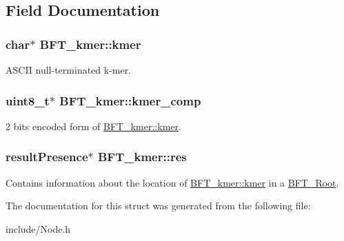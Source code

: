 \subsection{Field Documentation}
\subsubsection[{\texorpdfstring{kmer}{kmer}}]{\setlength{\rightskip}{0pt plus 5cm}char$\ast$ B\+F\+T\+\_\+kmer\+::kmer}\hypertarget{structBFT__kmer_ae4cf6766f01ebfa54fe51d0e60bec942}{}\label{structBFT__kmer_ae4cf6766f01ebfa54fe51d0e60bec942}


A\+S\+C\+II null-\/terminated k-\/mer. 

\subsubsection[{\texorpdfstring{kmer\+\_\+comp}{kmer_comp}}]{\setlength{\rightskip}{0pt plus 5cm}uint8\+\_\+t$\ast$ B\+F\+T\+\_\+kmer\+::kmer\+\_\+comp}\hypertarget{structBFT__kmer_a9935a78617deffcf7a24fcca0143962c}{}\label{structBFT__kmer_a9935a78617deffcf7a24fcca0143962c}


2 bits encoded form of \hyperlink{structBFT__kmer_ae4cf6766f01ebfa54fe51d0e60bec942}{B\+F\+T\+\_\+kmer\+::kmer}. 

\subsubsection[{\texorpdfstring{res}{res}}]{\setlength{\rightskip}{0pt plus 5cm}result\+Presence$\ast$ B\+F\+T\+\_\+kmer\+::res}\hypertarget{structBFT__kmer_aab6ab4e17d069ebb9e5c467d8fee5002}{}\label{structBFT__kmer_aab6ab4e17d069ebb9e5c467d8fee5002}


Contains information about the location of \hyperlink{structBFT__kmer_ae4cf6766f01ebfa54fe51d0e60bec942}{B\+F\+T\+\_\+kmer\+::kmer} in a \hyperlink{structBFT__Root}{B\+F\+T\+\_\+\+Root}. 



The documentation for this struct was generated from the following file\+:\begin{DoxyCompactItemize}
\item 
include/Node.\+h\end{DoxyCompactItemize}
